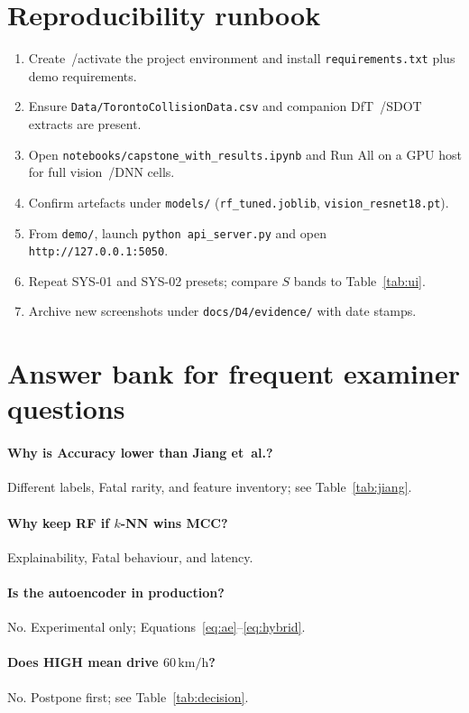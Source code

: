 \documentclass[11pt,a4paper]{article}
\begin{document}
\section*{Reproducibility runbook}
\begin{enumerate}[leftmargin=1.5em]
  \item Create~/activate the project environment and install \texttt{requirements.txt} plus demo requirements.
  \item Ensure \texttt{Data/TorontoCollisionData.csv} and companion DfT~/SDOT extracts are present.
  \item Open \texttt{notebooks/capstone\_with\_results.ipynb} and Run All on a GPU host for full vision~/DNN cells.
  \item Confirm artefacts under \texttt{models/} (\texttt{rf\_tuned.joblib}, \texttt{vision\_resnet18.pt}).
  \item From \texttt{demo/}, launch \texttt{python api\_server.py} and open \texttt{http://127.0.0.1:5050}.
  \item Repeat SYS-01 and SYS-02 presets; compare $S$ bands to Table~\ref{tab:ui}.
  \item Archive new screenshots under \texttt{docs/D4/evidence/} with date stamps.
\end{enumerate}

\newpage
\section*{Answer bank for frequent examiner questions}
\paragraph{Why is Accuracy lower than Jiang et~al.?}
Different labels, Fatal rarity, and feature inventory; see Table~\ref{tab:jiang}.

\paragraph{Why keep RF if $k$-NN wins MCC?}
Explainability, Fatal behaviour, and latency.

\paragraph{Is the autoencoder in production?}
No. Experimental only; Equations~\eqref{eq:ae}--\eqref{eq:hybrid}.

\paragraph{Does HIGH mean drive $60\,\mathrm{km/h}$?}
No. Postpone first; see Table~\ref{tab:decision}.
\end{document}
